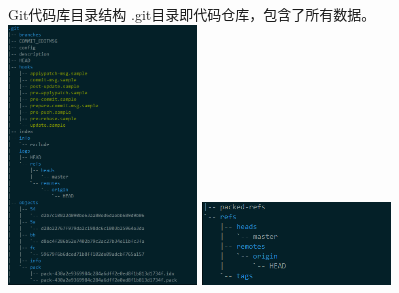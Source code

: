 \documentclass[CJK, 10pt]{beamer}
\begin{document}
\begin{CJK*}{UTF8}{gbsn}
\begin{frame}{Git代码库目录结构}
.git目录即代码仓库，包含了所有数据。\\
\includegraphics[width=5cm]{tree-dot-git-1.png} \hfill
\includegraphics[width=5cm]{tree-dot-git-2.png}
\end{frame}


\end{CJK*}
\end{document}
